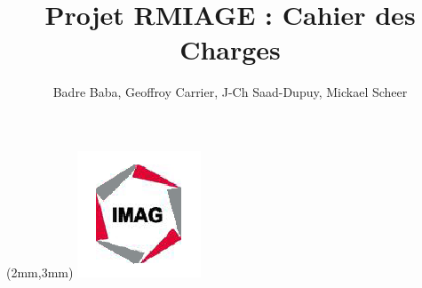 \documentclass[10pt,a4paper]{article}
\title{Projet RMIAGE : Cahier des Charges}
\author{
	Badre Baba, Geoffroy Carrier, J-Ch Saad-Dupuy, Mickael Scheer
}
\begin{document}
\begin{center}
\begin{textblock*}{35cm}(2mm,3mm)
\includegraphics[scale=0.8]{imag_logo.png}
\end{textblock*}
\end{center}
 
\maketitle



\end{document}
